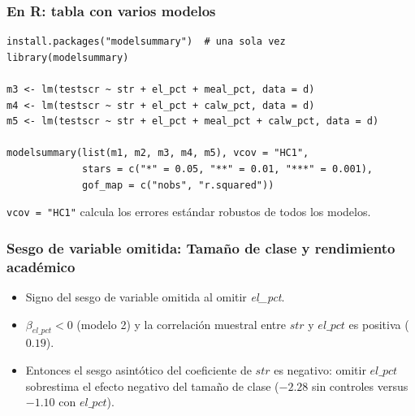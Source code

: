 \documentclass[t, compress, spanish, aspectratio=169]{beamer}
\begin{document}
\begin{frame}[fragile]
	\frametitle{En R: tabla con varios modelos}
\footnotesize
\begin{verbatim}
install.packages("modelsummary")  # una sola vez
library(modelsummary)

m3 <- lm(testscr ~ str + el_pct + meal_pct, data = d)
m4 <- lm(testscr ~ str + el_pct + calw_pct, data = d)
m5 <- lm(testscr ~ str + el_pct + meal_pct + calw_pct, data = d)

modelsummary(list(m1, m2, m3, m4, m5), vcov = "HC1",
             stars = c("*" = 0.05, "**" = 0.01, "***" = 0.001),
             gof_map = c("nobs", "r.squared"))
\end{verbatim}
\small
\texttt{vcov = "HC1"} calcula los errores est\'andar robustos de todos los modelos.
\end{frame}
	\begin{frame}
		\frametitle{Sesgo de variable omitida: Tama\~no de clase y rendimiento acad\'emico}
		\begin{itemize}
			\item Signo del sesgo de variable omitida al omitir \emph{el\_pct}.
			\item <2-> $\beta_{el\_pct}<0$ (modelo 2) y la correlaci\'on muestral entre $str$ y $el\_pct$ es positiva ($0.19$).
			\item <3-> Entonces el sesgo asint\'otico del coeficiente de $str$ es negativo: omitir $el\_pct$ sobrestima el efecto negativo del tama\~no de clase ($-2.28$ sin controles versus $-1.10$ con $el\_pct$).
		\end{itemize}
	\end{frame}
%	
\end{document}
